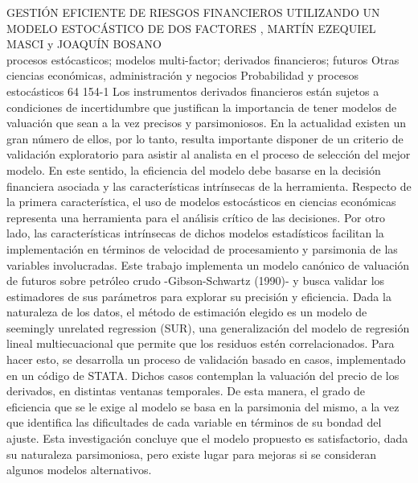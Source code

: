 \A
{GESTIÓN EFICIENTE DE RIESGOS FINANCIEROS UTILIZANDO UN MODELO ESTOCÁSTICO DE DOS FACTORES}
{, MARTÍN EZEQUIEL MASCI y JOAQUÍN BOSANO}
{
\\}
{procesos estócasticos; modelos multi-factor; derivados financieros; futuros} 
 {Otras ciencias económicas, administración y negocios} 
 {Probabilidad y procesos estocásticos} 
 {64} 
 {154-1}
{Los instrumentos derivados financieros están sujetos a condiciones de incertidumbre que justifican la importancia de tener modelos de valuación que sean a la vez precisos y parsimoniosos. En la actualidad existen un gran número de ellos, por lo tanto, resulta importante disponer de un criterio de validación exploratorio para asistir al analista en el proceso de selección del mejor modelo. En este sentido, la eficiencia del modelo debe basarse en la decisión financiera asociada y las características intrínsecas de la herramienta. Respecto de la primera característica, el uso de modelos estocásticos en ciencias económicas representa una herramienta para el análisis crítico de las decisiones. Por otro lado, las características intrínsecas de dichos modelos estadísticos facilitan la implementación en términos de velocidad de procesamiento y parsimonia de las variables involucradas. Este trabajo implementa un modelo canónico de valuación de futuros sobre petróleo crudo -Gibson-Schwartz (1990)- y busca validar los estimadores de sus parámetros para explorar su precisión y eficiencia. Dada la naturaleza de los datos, el método de estimación elegido es un modelo de seemingly unrelated regression (SUR), una generalización del modelo de regresión lineal multiecuacional que permite que los residuos estén correlacionados. Para hacer esto, se desarrolla un proceso de validación basado en casos, implementado en un código de STATA. Dichos casos contemplan la valuación del precio de los derivados, en distintas ventanas temporales. De esta manera, el grado de eficiencia que se le exige al modelo se basa en la parsimonia del mismo, a la vez que identifica las dificultades de cada variable en términos de su bondad del ajuste. Esta investigación concluye que el modelo propuesto es satisfactorio, dada su naturaleza parsimoniosa, pero existe lugar para mejoras si se consideran algunos modelos alternativos. }
